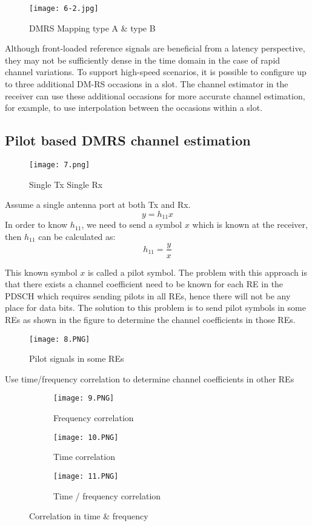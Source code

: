\begin{figure}[ht]
\centering
\texttt{[image: 6-2.jpg]}
\caption{DMRS Mapping type A \& type B }
\end{figure}

Although front-loaded reference signals are beneficial from a latency perspective, they may not be sufficiently dense in the time domain in the case of rapid channel variations. To support high-speed scenarios, it is possible to configure up to three additional DM-RS occasions in a slot. The channel estimator in the receiver can use these additional occasions for more accurate channel estimation, for example, to use interpolation between the occasions within a slot.

\subsection{Pilot based DMRS channel estimation}
\begin{wrapfigure}{r}{0.4\textwidth}
    \centering
    \texttt{[image: 7.png]}
    \caption{Single Tx Single Rx}
    \label{fig:Single Tx Single Rx}
\end{wrapfigure}

Assume a single antenna port at both Tx and Rx.
\[ y = h_{11} x \]
In order to know $h_11$, we need to send a symbol $x$ which is known at the receiver, then $h_11$ can be calculated as:
\[ h_{11} = \frac{y}{x} \]

This known symbol $x$ is called a pilot symbol.
The problem with this approach is that there exists a channel coefficient need to be known for each RE in the PDSCH which requires sending pilots in all REs, hence there will not be any place for data bits.
The solution to this problem is to send pilot symbols in some REs as shown in the figure to determine the channel coefficients in those REs.

\begin{figure}[ht]
\centering
\texttt{[image: 8.PNG]}
\caption{Pilot signals in some REs}
\end{figure}     

Use time/frequency correlation to determine channel coefficients in other REs

\begin{figure}[ht]
\centering
    \begin{subfigure}[b]{0.4\textwidth}
        \centering
        \texttt{[image: 9.PNG]}
        \caption{Frequency correlation }
    \end{subfigure}
    \hfill
    \begin{subfigure}[b]{0.4\textwidth}
        \centering
        \texttt{[image: 10.PNG]}
        \caption{Time correlation }
    \end{subfigure}
    \hfill
    \begin{subfigure}[c]{0.4\textwidth}
        \centering
        \texttt{[image: 11.PNG]}
        \caption{Time / frequency correlation }
    \end{subfigure}
       \caption{Correlation in time \& frequency}
\end{figure}


